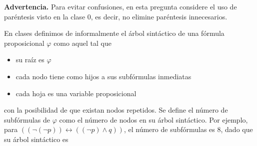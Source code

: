 

\newcommand{\largo}{\text{la}}
\newcommand{\nsf}{\text{nsf}}

\textbf{Advertencia.} Para evitar confusiones, en esta pregunta considere el uso de paréntesis visto en la clase 0, es decir, no elimine paréntesis innecesarios.\medskip

En clases definimos de informalmente el árbol sintáctico de una fórmula proposicional $\varphi$ como aquel tal que
\begin{itemize}
	\item su raíz es $\varphi$
	\item cada nodo tiene como hijos a sus subfórmulas inmediatas
	\item cada hoja es una variable proposicional
\end{itemize}
con la posibilidad de que existan nodos repetidos. Se define el número de subfórmulas de $\varphi$ como el número de nodos en su árbol sintáctico.
Por ejemplo, para $((\neg(\neg p))\leftrightarrow ((\neg p)\wedge q))$, el número de subfórmulas es 8, dado que su árbol sintáctico es 

\begin{center}
	
\end{center}

